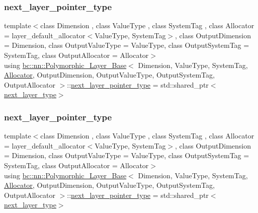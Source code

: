 \subsubsection{\texorpdfstring{next\+\_\+layer\+\_\+pointer\+\_\+type}{next\_layer\_pointer\_type}\hspace{0.1cm}{\footnotesize\ttfamily [1/2]}}
{\footnotesize\ttfamily template$<$class Dimension , class Value\+Type , class System\+Tag , class Allocator  = layer\+\_\+default\+\_\+allocator$<$\+Value\+Type, System\+Tag$>$, class Output\+Dimension  = Dimension, class Output\+Value\+Type  = Value\+Type, class Output\+System\+Tag  = System\+Tag, class Output\+Allocator  = Allocator$>$ \\
using \hyperlink{structbc_1_1nn_1_1Polymorphic__Layer__Base}{bc\+::nn\+::\+Polymorphic\+\_\+\+Layer\+\_\+\+Base}$<$ Dimension, Value\+Type, System\+Tag, \hyperlink{classbc_1_1allocators_1_1Allocator}{Allocator}, Output\+Dimension, Output\+Value\+Type, Output\+System\+Tag, Output\+Allocator $>$\+::\hyperlink{structbc_1_1nn_1_1Polymorphic__Layer__Base_a6f8d2b06bb46d0ef96d0857df2544731}{next\+\_\+layer\+\_\+pointer\+\_\+type} =  std\+::shared\+\_\+ptr$<$\hyperlink{structbc_1_1nn_1_1Polymorphic__Layer__Base_ac7d70db83e8370d2975d05401713f677}{next\+\_\+layer\+\_\+type}$>$}

\mbox{\label{structbc_1_1nn_1_1Polymorphic__Layer__Base_a6f8d2b06bb46d0ef96d0857df2544731}} 
\subsubsection{\texorpdfstring{next\+\_\+layer\+\_\+pointer\+\_\+type}{next\_layer\_pointer\_type}\hspace{0.1cm}{\footnotesize\ttfamily [2/2]}}
{\footnotesize\ttfamily template$<$class Dimension , class Value\+Type , class System\+Tag , class Allocator  = layer\+\_\+default\+\_\+allocator$<$\+Value\+Type, System\+Tag$>$, class Output\+Dimension  = Dimension, class Output\+Value\+Type  = Value\+Type, class Output\+System\+Tag  = System\+Tag, class Output\+Allocator  = Allocator$>$ \\
using \hyperlink{structbc_1_1nn_1_1Polymorphic__Layer__Base}{bc\+::nn\+::\+Polymorphic\+\_\+\+Layer\+\_\+\+Base}$<$ Dimension, Value\+Type, System\+Tag, \hyperlink{classbc_1_1allocators_1_1Allocator}{Allocator}, Output\+Dimension, Output\+Value\+Type, Output\+System\+Tag, Output\+Allocator $>$\+::\hyperlink{structbc_1_1nn_1_1Polymorphic__Layer__Base_a6f8d2b06bb46d0ef96d0857df2544731}{next\+\_\+layer\+\_\+pointer\+\_\+type} =  std\+::shared\+\_\+ptr$<$\hyperlink{structbc_1_1nn_1_1Polymorphic__Layer__Base_ac7d70db83e8370d2975d05401713f677}{next\+\_\+layer\+\_\+type}$>$}

